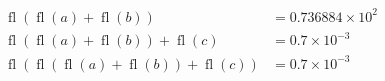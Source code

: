 \begin{frame}
\begin{solution}
		\begin{align*}
			\operatorname{fl}\left(\operatorname{fl}\left(a\right)+\operatorname{fl}\left(b\right)\right)
			 & =
			0.736884\times 10^{2} \\
			\operatorname{fl}\left(\operatorname{fl}\left(a\right)+\operatorname{fl}\left(b\right)\right)+
			\operatorname{fl}\left(c\right)
			 & =0.7\times 10^{-3} \\
			\operatorname{fl}\left(\operatorname{fl}\left(\operatorname{fl}\left(a\right)+\operatorname{fl}\left(b\right)\right)+
			\operatorname{fl}\left(c\right)\right)
			 & =
			0.7\times 10^{-3}
		\end{align*}

	\end{solution}
\end{frame}